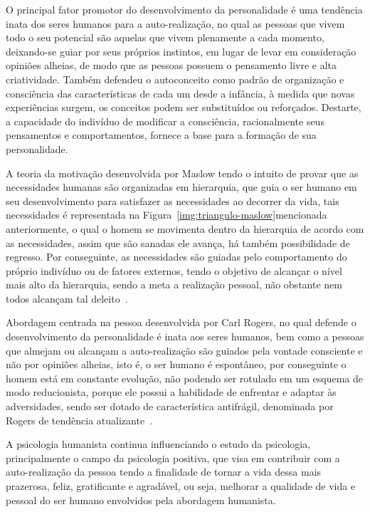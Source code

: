 O principal fator promotor do desenvolvimento da personalidade é uma tendência inata dos seres humanos para a auto-realização, no qual as pessoas que vivem todo o seu potencial são aquelas que vivem plenamente a cada momento, deixando-se guiar por seus próprios instintos, em lugar de levar em consideração opiniões alheias, de modo que as pessoas possuem o pensamento livre e alta criatividade.
Também defendeu o autoconceito como padrão de organização e consciência das características de cada um desde a infância, à medida que novas experiências surgem, os conceitos podem ser substituídos ou reforçados. 
Destarte, a capacidade do indivíduo de modificar a consciência, racionalmente seus pensamentos e comportamentos, fornece a base para a formação de sua personalidade. 

A teoria da motivação desenvolvida por Maslow tendo o intuito de provar que as necessidades humanas são organizadas em hierarquia, que guia o ser humano em seu desenvolvimento para satisfazer as necessidades ao decorrer da vida, tais necessidades é representada na Figura~\ref{img:triangulo-maslow}mencionada anteriormente, o qual o homem se movimenta dentro da hierarquia de acordo com as necessidades, assim que são sanadas ele avança, há também possibilidade de regresso.
Por conseguinte, as necessidades são guiadas pelo comportamento do próprio indivíduo ou de fatores externos, tendo o objetivo de alcançar o nível mais alto da hierarquia, sendo a meta a realização pessoal, não obstante nem todos alcançam tal deleito~\cite{laruse2009geral}.

Abordagem centrada na pessoa desenvolvida por Carl Rogers, no qual defende o desenvolvimento da personalidade é inata aos seres humanos, bem como a pessoas que almejam ou alcançam a auto-realização são guiados pela vontade consciente e não por opiniões alheias, isto é, o ser humano é espontâneo, por conseguinte o homem está em constante evolução, não podendo ser rotulado em um esquema de modo reducionista, porque ele possui a habilidade de enfrentar e adaptar às adversidades, sendo ser dotado de característica antifrágil, denominada por Rogers de tendência atualizante~\cite{rogers2017pessoa}. 

A psicologia humanista continua influenciando o estudo da psicologia, principalmente o campo da psicologia positiva, que visa em contribuir com a auto-realização da pessoa tendo a finalidade de tornar a vida dessa mais prazerosa, feliz, gratificante e agradável, ou seja, melhorar a qualidade de vida e pessoal do ser humano envolvidos pela abordagem humanista. 
